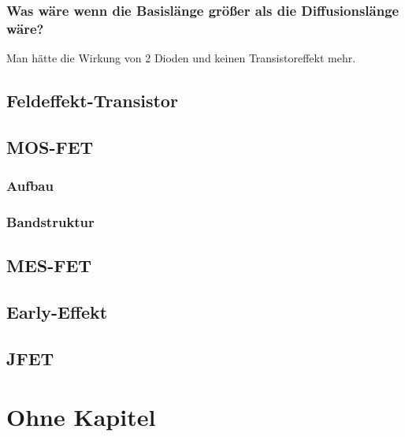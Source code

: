 \documentclass{article}
\begin{document}
    \subsubsection{Was w\"are wenn die Basisl\"ange gr\"o{\ss}er als die Diffusionsl\"ange w\"are?} Man h\"atte die Wirkung von 2 Dioden und keinen Transistoreffekt mehr.

\subsection{Feldeffekt-Transistor}\label{k6:fet}

\subsection{MOS-FET}\label{k6:mosfet}
    \subsubsection{Aufbau}
    \subsubsection{Bandstruktur}

\subsection{MES-FET}\label{k6:mesfet}

\subsection{Early-Effekt}\label{k6:early}

\subsection{JFET}\label{k6:jfet}

\section{Ohne Kapitel}
\end{document}
